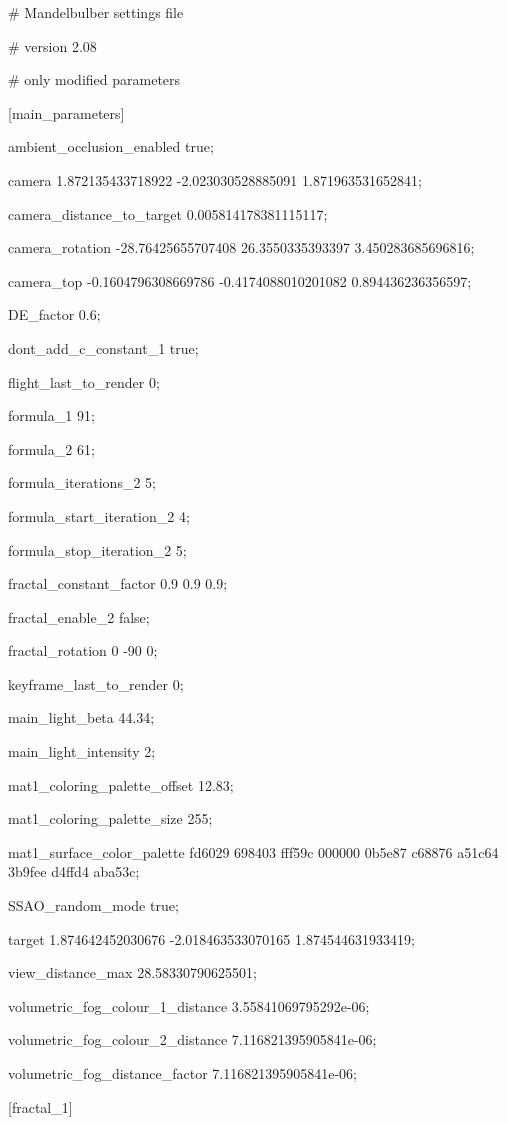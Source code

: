 \# Mandelbulber settings file

\# version 2.08

\# only modified parameters

{[}main\_parameters{]}

ambient\_occlusion\_enabled true;

camera 1.872135433718922 -2.023030528885091 1.871963531652841;

camera\_distance\_to\_target 0.005814178381115117;

camera\_rotation -28.76425655707408 26.3550335393397 3.450283685696816;

camera\_top -0.1604796308669786 -0.4174088010201082 0.894436236356597;

DE\_factor 0.6;

dont\_add\_c\_constant\_1 true;

flight\_last\_to\_render 0;

formula\_1 91;

formula\_2 61;

formula\_iterations\_2 5;

formula\_start\_iteration\_2 4;

formula\_stop\_iteration\_2 5;

fractal\_constant\_factor 0.9 0.9 0.9;

fractal\_enable\_2 false;

fractal\_rotation 0 -90 0;

keyframe\_last\_to\_render 0;

main\_light\_beta 44.34;

main\_light\_intensity 2;

mat1\_coloring\_palette\_offset 12.83;

mat1\_coloring\_palette\_size 255;

mat1\_surface\_color\_palette fd6029 698403 fff59c 000000 0b5e87 c68876
a51c64 3b9fee d4ffd4 aba53c;

SSAO\_random\_mode true;

target 1.874642452030676 -2.018463533070165 1.874544631933419;

view\_distance\_max 28.58330790625501;

volumetric\_fog\_colour\_1\_distance 3.55841069795292e-06;

volumetric\_fog\_colour\_2\_distance 7.116821395905841e-06;

volumetric\_fog\_distance\_factor 7.116821395905841e-06;

{[}fractal\_1{]}

